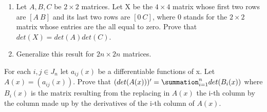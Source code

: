 \documentclass[12pt,letterpaper,cm]{hmcpset}
\begin{document}
\begin{solution}
    
\end{solution}

\pagebreak

\begin{problem}[A4]
    \begin{enumerate}
        \item Let $A,B,C$ be $2\times 2$ matrices. Let X be the $4\times 4$ matrix whose first two rows are $[A\ B]$ and its last two rows are $[0\ C]$, where 0 stands for the $2\times 2$ matrix whose entries are the all equal to zero. Prove that $det(X) = det(A)det(C)$.
        \item Generalize this result for $2n \times 2n$ matrices.
    \end{enumerate}
\end{problem}
\begin{solution}

\end{solution}
\pagebreak

\begin{problem}[A5]
    For each $i,j\in J_n$ let $a_{ij}(x)$ be a differentiable functions of x. Let $A(x) = (a_{ij}(x))$. Prove that $(det(A(x)))' = \summation_{i=1}^n det(B_i(x))$ where $B_i(x)$ is the matrix resulting from the replacing in $A(x)$ the i-th column by the column made up by the derivatives of the i-th column of $A(x)$. 
\end{problem}

\begin{solution}
    
\end{solution}
\end{document}
